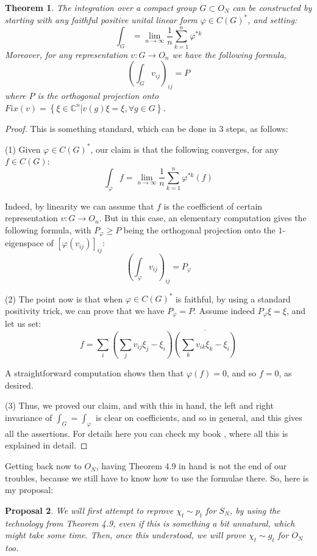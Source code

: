 \documentclass[12pt]{amsbook}
\newtheorem{theorem}{Theorem}[chapter]
\newtheorem{proposal}[theorem]{Proposal}
\begin{document}

\begin{theorem}
The integration over a compact group $G\subset O_N$ can be constructed by starting with any faithful positive unital linear form $\varphi\in C(G)^*$, and setting:
$$\int_G=\lim_{n\to\infty}\frac{1}{n}\sum_{k=1}^n\varphi^{*k}$$
Moreover, for any representation $v:G\to O_n$ we have the following formula,
$$\left(\int_Gv_{ij}\right)_{ij}=P$$
where $P$ is the orthogonal projection onto $Fix(v)=\left\{\xi\in\mathbb C^n\big|v(g)\xi=\xi,\forall g\in G\right\}$.
\end{theorem}

\begin{proof}
This is something standard, which can be done in 3 steps, as follows:

\medskip

(1) Given $\varphi\in C(G)^*$, our claim is that the following converges, for any $f\in C(G)$:
$$\int_\varphi f=\lim_{n\to\infty}\frac{1}{n}\sum_{k=1}^n\varphi^{*k}(f)$$

Indeed, by linearity we can assume that $f$ is the coefficient of certain representation $v:G\to O_n$. But in this case, an elementary computation gives the following formula, with $P_\varphi\geq P$ being the orthogonal projection onto the $1$-eigenspace of $[\varphi(v_{ij})]_{ij}$:
$$\left(\int_\varphi v_{ij}\right)_{ij}=P_\varphi$$

(2) The point now is that when $\varphi\in C(G)^*$ is faithful, by using a standard positivity trick, we can prove that we have $P_\varphi=P$. Assume indeed $P_\varphi\xi=\xi$, and let us set:
$$f=\sum_i\left(\sum_jv_{ij}\xi_j-\xi_i\right)\overline{\left(\sum_kv_{ik}\xi_k-\xi_i\right)}$$

A straightforward computation shows then that $\varphi(f)=0$, and so $f=0$, as desired.

\medskip

(3) Thus, we proved our claim, and with this in hand, the left and right invariance of $\int_G=\int_\varphi$ is clear on coefficients, and so in general, and this gives all the assertions. For details here you can check my book \cite{ba1}, where all this is explained in detail.
\end{proof}

Getting back now to $O_N$, having Theorem 4.9 in hand is not the end of our troubles, because we still have to know how to use the formulae there. So, here is my proposal:

\begin{proposal}
We will first attempt to reprove $\chi_t\sim p_t$ for $S_N$, by using the technology from Theorem 4.9, even if this is something a bit unnatural, which might take some time. Then, once this understood, we will prove $\chi_t\sim g_t$ for $O_N$ too.
\end{proposal}
\end{document}
